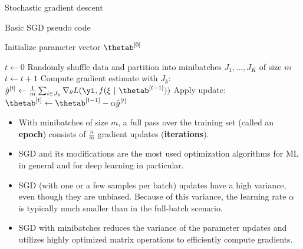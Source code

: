 \begin{vbframe}{Stochastic gradient descent}

  \begin{algorithm}[H]
  \footnotesize
    \caption{Basic SGD pseudo code}
    \begin{algorithmic}[1]
    \State Initialize parameter vector $\thetab^{[0]}$ 
    
    \State $t \leftarrow 0$
    \State Randomly shuffle data and partition into minibatches $J_1, ..., J_K$ of size $m$
      \State $t \leftarrow t + 1$ 
      \State Compute gradient estimate with $J_k$: $\hat{g}^{[t]} \leftarrow \frac{1}{m} \sum_{i \in J_k} \nabla_\theta L(\yi, f(\xi ~|~ \thetab^{[t-1]})) $
      \State Apply update: $\thetab^{[t]} \leftarrow \thetab^{[t-1]} - \alpha \hat{g}^{[t]}$
      
      \EndFor
    
        
      \EndWhile
    \end{algorithmic}
  \end{algorithm}
 
\framebreak


\vspace*{0.5cm}
  \begin{itemize}
    \item With minibatches of size $m$, a full pass over the training set (called an \textbf{epoch}) consists of $\frac{n}{m}$ gradient updates (\textbf{iterations}).
    \item SGD and its modifications are the most used optimization algorithms for ML in general and for deep learning in particular.
    \item SGD (with one or a few samples per batch) updates have a high variance, even though they are unbiased. 
      Because of this variance, the learning rate $\alpha$ is typically much smaller than in the full-batch scenario.
    \item SGD with minibatches reduces the variance of the parameter updates and utilizes highly optimized matrix operations to efficiently compute gradients.
   \end{itemize}


\end{vbframe}
